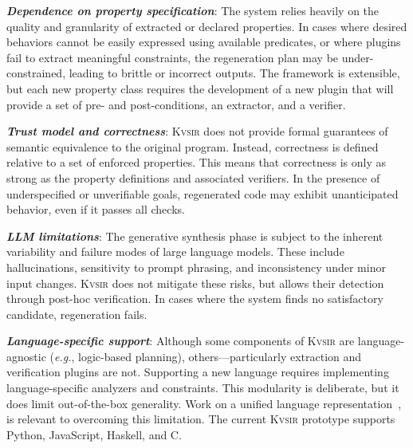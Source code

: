 \documentclass[sigplan,review,anonymous,10pt]{acmart}
\def\eg{{\em e.g.}, }
\newcommand{\sys}{{\scshape Kv{\textalpha}sir}\xspace}
\newcommand{\heading}[1]{\vspace{2pt}\noindent\textbf{\emph{#1}}:\enspace}
\begin{document}
\heading{Dependence on property specification}
The system relies heavily on the quality and granularity of extracted or declared properties.
In cases where desired behaviors cannot be easily expressed using available predicates, or where plugins fail to extract meaningful constraints, the regeneration plan may be under-constrained, leading to brittle or incorrect outputs. The framework is extensible, but each new property class requires the development of a new plugin that will provide a set of pre- and post-conditions, an extractor, and a verifier.

\heading{Trust model and correctness}
\sys
does not provide formal guarantees
of semantic equivalence
to the original program.
Instead,
correctness is defined relative to a set of enforced properties.
This means that correctness is only as strong as the property definitions and associated verifiers.
In the presence of underspecified or unverifiable goals,
regenerated code
may exhibit unanticipated behavior,
even if it passes all checks. 


\heading{LLM limitations}
The generative synthesis phase
is subject to the inherent variability and failure modes
of large language models.
These include hallucinations,
sensitivity to prompt phrasing,
and inconsistency
under minor input changes.
\sys does not mitigate these risks,
but allows their detection
through post-hoc verification.
In cases where the system finds no satisfactory candidate,
regeneration fails.

\heading{Language-specific support}
Although some components of \sys are language-agnostic (\eg logic-based planning),
others---particularly extraction and verification plugins are not.
Supporting a new language
requires implementing language-specific analyzers and constraints.
This modularity is deliberate,
but it does limit out-of-the-box generality.
Work on a unified language representation~\cite{koppel2018onetool,bap2011,dillig2009sail},
is relevant to overcoming this limitation.
The current \sys prototype
supports Python, JavaScript, Haskell, and C. 

\end{document}
